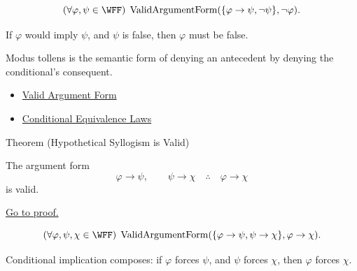 \begin{remark*}
\[
(\forall\varphi,\psi\in\WFF)\;\operatorname{ValidArgumentForm}(\{\varphi\to\psi,\neg\psi\},\neg\varphi).
\]
\end{remark*}

\begin{remark*}
If \(\varphi\) would imply \(\psi\), and \(\psi\) is false, then \(\varphi\) must be false.
\end{remark*}

\begin{remark*}[Interpretation]
Modus tollens is the semantic form of denying an antecedent by denying the
conditional's consequent.
\end{remark*}

\begin{dependencies}
\begin{itemize}
  \item \hyperref[def:valid-argument-form-propositional-logic]{Valid Argument Form}
  \item \hyperref[thm:conditional-equivalence-laws-propositional-logic]{Conditional Equivalence Laws}
\end{itemize}
\end{dependencies}

\begin{theorembox}{Theorem (Hypothetical Syllogism is Valid)}
\begin{theorem}
\label{thm:hypothetical-syllogism-validity-propositional-logic}
The argument form
\[
\varphi\to\psi,\qquad \psi\to\chi \quad\therefore\quad \varphi\to\chi
\]
is valid.

\noindent\hyperref[prf:hypothetical-syllogism-validity-propositional-logic]{Go to proof.}
\end{theorem}
\end{theorembox}

\begin{remark*}
\[
(\forall\varphi,\psi,\chi\in\WFF)\;\operatorname{ValidArgumentForm}(\{\varphi\to\psi,\psi\to\chi\},\varphi\to\chi).
\]
\end{remark*}

\begin{remark*}
Conditional implication composes: if \(\varphi\) forces \(\psi\), and \(\psi\) forces \(\chi\), then \(\varphi\) forces \(\chi\).
\end{remark*}

